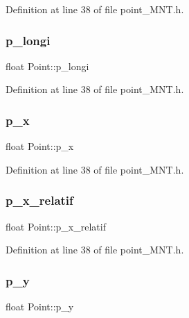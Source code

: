Definition at line 38 of file point\+\_\+\+M\+N\+T.\+h.

\mbox{\label{class_point_acee2bfc413dce3e1b69524e85305980b}} 
\subsubsection{\texorpdfstring{p\+\_\+longi}{p\_longi}}
{\footnotesize\ttfamily float Point\+::p\+\_\+longi}



Definition at line 38 of file point\+\_\+\+M\+N\+T.\+h.

\mbox{\label{class_point_a7ed90ddaad8bfac738d4ac9a7b6f620f}} 
\subsubsection{\texorpdfstring{p\+\_\+x}{p\_x}}
{\footnotesize\ttfamily float Point\+::p\+\_\+x}



Definition at line 38 of file point\+\_\+\+M\+N\+T.\+h.

\mbox{\label{class_point_ae85c8ed96afee827cddee534ae367787}} 
\subsubsection{\texorpdfstring{p\+\_\+x\+\_\+relatif}{p\_x\_relatif}}
{\footnotesize\ttfamily float Point\+::p\+\_\+x\+\_\+relatif}



Definition at line 38 of file point\+\_\+\+M\+N\+T.\+h.

\mbox{\label{class_point_a420b83b0054d2ffc151aac30585c7f4a}} 
\subsubsection{\texorpdfstring{p\+\_\+y}{p\_y}}
{\footnotesize\ttfamily float Point\+::p\+\_\+y}



